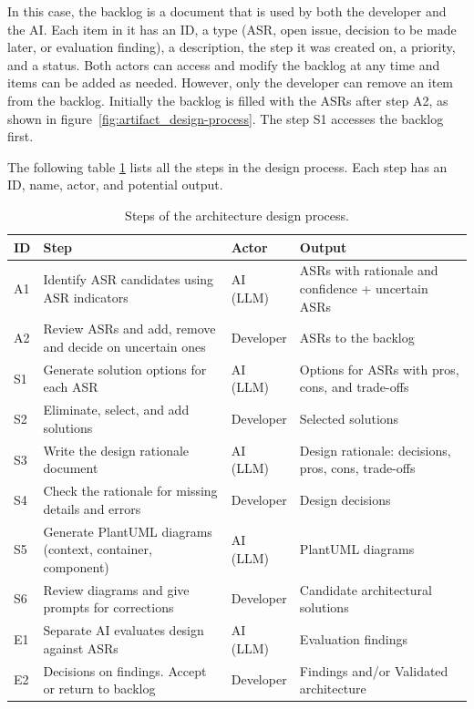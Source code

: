 In this case, the backlog is a document that is used by both the developer and the AI. Each item in it has an ID, a type (ASR, open issue, decision to be made later, or evaluation finding), a description, the step it was created on, a priority, and a status. Both actors can access and modify the backlog at any time and items can be added as needed. However, only the developer can remove an item from the backlog. Initially the backlog is filled with the ASRs after step A2, as shown in figure~\ref{fig:artifact_design-process}. The step S1 accesses the backlog first.

The following table \ref{tab:design_process_steps} lists all the steps in the design process. Each step has an ID, name, actor, and potential output.

\begin{table}[!htbp]
	\caption{Steps of the architecture design process.}
	\label{tab:design_process_steps}
	\begin{tabularx}{\textwidth}{l X l X}
		\toprule
		\textbf{ID} & \textbf{Step}                                              & \textbf{Actor} & \textbf{Output}                                     \\
		\midrule
		A1          & Identify ASR candidates using ASR indicators               & AI (LLM)       & ASRs with rationale and confidence + uncertain ASRs \\
		A2          & Review ASRs and add, remove and decide on uncertain ones   & Developer      & ASRs to the backlog                                 \\
		S1          & Generate solution options for each ASR                     & AI (LLM)       & Options for ASRs with pros, cons, and trade-offs    \\
		S2          & Eliminate, select, and add solutions                       & Developer      & Selected solutions                                  \\
		S3          & Write the design rationale document                        & AI (LLM)       & Design rationale: decisions, pros, cons, trade-offs \\
		S4          & Check the rationale for missing details and errors         & Developer      & Design decisions                                    \\
		S5          & Generate PlantUML diagrams (context, container, component) & AI (LLM)       & PlantUML diagrams                                   \\
		S6          & Review diagrams and give prompts for corrections           & Developer      & Candidate architectural solutions                   \\
		E1          & Separate AI evaluates design against ASRs                  & AI (LLM)       & Evaluation findings                                 \\
		E2          & Decisions on findings. Accept or return to backlog         & Developer      & Findings and/or Validated architecture              \\
		\bottomrule
	\end{tabularx}
\end{table}

